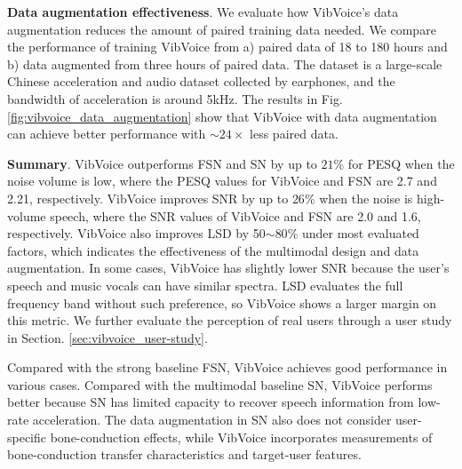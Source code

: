 \noindent\textbf{Data augmentation effectiveness}.
We evaluate how VibVoice's data augmentation reduces the amount of paired training data needed. We compare the performance of training VibVoice from a) paired data of 18 to 180 hours and b) data augmented from three hours of paired data. The dataset \citep{wang2022fusing} is a large-scale Chinese acceleration and audio dataset collected by earphones, and the bandwidth of acceleration is around 5kHz. The results in Fig. \ref{fig:vibvoice_data_augmentation} show that VibVoice with data augmentation can achieve better performance with $\sim24\times$ less paired data.

\noindent\textbf{Summary}.
VibVoice outperforms FSN and SN by up to $21\%$ for PESQ when the noise volume is low, where the PESQ values for VibVoice and FSN are 2.7 and 2.21, respectively. VibVoice improves SNR by up to $26\%$ when the noise is high-volume speech, where the SNR values of VibVoice and FSN are 2.0 and 1.6, respectively. VibVoice also improves LSD by 50$\sim$80$\%$ under most evaluated factors, which indicates the effectiveness of the multimodal design and data augmentation. In some cases, VibVoice has slightly lower SNR because the user's speech and music vocals can have similar spectra. LSD evaluates the full frequency band without such preference, so VibVoice shows a larger margin on this metric.
We further evaluate the perception of real users through a user study in Section. \ref{sec:vibvoice_user-study}.


Compared with the strong baseline FSN, VibVoice achieves good performance in various cases. 
Compared with the multimodal baseline SN, VibVoice performs better because SN has limited capacity to recover speech information from low-rate acceleration. The data augmentation in SN also does not consider user-specific bone-conduction effects, while VibVoice incorporates measurements of bone-conduction transfer characteristics and target-user features.


